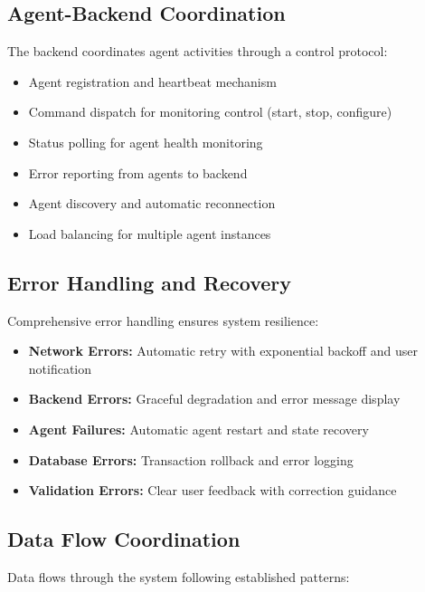 \subsection{Agent-Backend Coordination}

The backend coordinates agent activities through a control protocol:

\begin{itemize}
    \item Agent registration and heartbeat mechanism
    \item Command dispatch for monitoring control (start, stop, configure)
    \item Status polling for agent health monitoring
    \item Error reporting from agents to backend
    \item Agent discovery and automatic reconnection
    \item Load balancing for multiple agent instances
\end{itemize}

\subsection{Error Handling and Recovery}

Comprehensive error handling ensures system resilience:

\begin{itemize}
    \item \textbf{Network Errors:} Automatic retry with exponential backoff and user notification
    \item \textbf{Backend Errors:} Graceful degradation and error message display
    \item \textbf{Agent Failures:} Automatic agent restart and state recovery
    \item \textbf{Database Errors:} Transaction rollback and error logging
    \item \textbf{Validation Errors:} Clear user feedback with correction guidance
\end{itemize}

\subsection{Data Flow Coordination}

Data flows through the system following established patterns:

